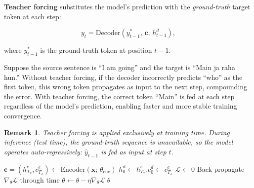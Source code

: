 \documentclass[12pt,a4paper]{article}
\newtheorem{remark}{Remark}[section]
\begin{document}
\textbf{Teacher forcing} substitutes the model's prediction with the
\emph{ground-truth} target token at each step:

\begin{equation}
  y_t = \text{Decoder}(y^*_{t-1},\, \mathbf{c},\, h^d_{t-1}),
  \label{eq:teacher_forcing}
\end{equation}

where $y^*_{t-1}$ is the ground-truth token at position $t-1$.

\begin{example}[title=Teacher Forcing for English-to-Hindi Translation]
  Suppose the source sentence is ``I am going'' and the target is
  ``Main ja raha hun.'' Without teacher forcing, if the decoder incorrectly
  predicts ``who'' as the first token, this wrong token propagates as input
  to the next step, compounding the error.  With teacher forcing, the correct
  token ``Main'' is fed at each step regardless of the model's prediction,
  enabling faster and more stable training convergence.
\end{example}

\begin{remark}
  \label{rem:teacher_forcing_inference}
  Teacher forcing is applied \emph{exclusively at training time}.  During
  inference (test time), the ground-truth sequence is unavailable, so the model
  operates auto-regressively: $\hat{y}_{t-1}$ is fed as input at step $t$.
\end{remark}

\begin{algorithm}[H]
\caption{Seq2Seq Training with Teacher Forcing}
\label{alg:seq2seq_train}
\SetAlgoLined
{}
\BlankLine
$\mathbf{c} = (h^e_{T_x}, c^e_{T_x}) \leftarrow \text{Encoder}(\mathbf{x};\,\theta_{\text{enc}})$\;
$h^d_0 \leftarrow h^e_{T_x}$,\quad $c^d_0 \leftarrow c^e_{T_x}$\;
$\mathcal{L} \leftarrow 0$\;
Back-propagate $\nabla_\theta \mathcal{L}$ through time\;
$\theta \leftarrow \theta - \eta \nabla_\theta \mathcal{L}$\;
\Return $\theta$\;
\end{algorithm}

\end{document}
